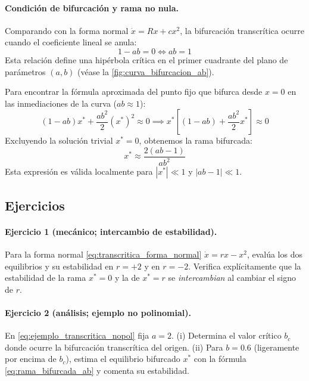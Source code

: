 \paragraph{Condición de bifurcación y rama no nula.}
Comparando con la forma normal $\dot{x} = R x + c x^2$, la bifurcación transcrítica ocurre cuando el coeficiente lineal se anula:
\begin{equation}
    1 - ab = 0 \iff \boxed{ab = 1}
\end{equation}
Esta relación define una hipérbola crítica en el primer cuadrante del plano de parámetros $(a, b)$ (véase la \cref{fig:curva_bifurcacion_ab}).

Para encontrar la fórmula aproximada del punto fijo que bifurca desde $x=0$ en las inmediaciones de la curva ($ab \approx 1$):
\begin{equation}
    (1 - ab)x^* + \frac{ab^2}{2}(x^*)^2 \approx 0 \implies x^* \left[(1 - ab) + \frac{ab^2}{2}x^*\right] \approx 0
\end{equation}
Excluyendo la solución trivial $x^* = 0$, obtenemos la rama bifurcada:
\begin{equation}
    x^* \approx \frac{2(ab - 1)}{ab^2}
    \label{eq:rama_bifurcada_ab}
\end{equation}
Esta expresión es válida localmente para $|x^*| \ll 1$ y $|ab - 1| \ll 1$.

\subsection{Ejercicios}

\paragraph{Ejercicio 1 (mecánico; intercambio de estabilidad).} Para la forma normal \eqref{eq:transcritica_forma_normal} $\dot{x}=rx-x^2$, evalúa los dos equilibrios y su estabilidad en $r=+2$ y en $r=-2$. Verifica explícitamente que la estabilidad de la rama $x^*=0$ y la de $x^*=r$ se \emph{intercambian} al cambiar el signo de $r$.

\paragraph{Ejercicio 2 (análisis; ejemplo no polinomial).} En \eqref{eq:ejemplo_transcritica_nopol} fija $a=2$. (i) Determina el valor crítico $b_c$ donde ocurre la bifurcación transcrítica del origen. (ii) Para $b=0.6$ (ligeramente por encima de $b_c$), estima el equilibrio bifurcado $x^*$ con la fórmula \eqref{eq:rama_bifurcada_ab} y comenta su estabilidad.

